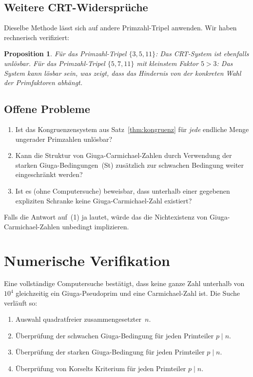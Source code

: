 \documentclass[12pt,a4paper]{amsart}
\newtheorem{proposition}[theorem]{Proposition}
\theoremstyle{definition}
\begin{document}
\subsection{Weitere CRT-Widersprüche}

Dieselbe Methode lässt sich auf andere Primzahl-Tripel anwenden.
Wir haben rechnerisch verifiziert:

\begin{proposition}
Für das Primzahl-Tripel $\{3, 5, 11\}$: Das CRT-System ist ebenfalls unlösbar.
Für das Primzahl-Tripel $\{5, 7, 11\}$ mit kleinstem Faktor $5 > 3$: Das System
kann lösbar sein, was zeigt, dass das Hindernis von der konkreten Wahl der
Primfaktoren abhängt.
\end{proposition}

\subsection{Offene Probleme}

\begin{enumerate}
  \item Ist das Kongruenzensystem aus Satz~\ref{thm:kongruenz} für \emph{jede} endliche
        Menge ungerader Primzahlen unlösbar?
  \item Kann die Struktur von Giuga-Carmichael-Zahlen durch Verwendung der starken
        Giuga-Bedingungen~(St) zusätzlich zur schwachen Bedingung weiter eingeschränkt
        werden?
  \item Ist es (ohne Computersuche) beweisbar, dass unterhalb einer gegebenen expliziten
        Schranke keine Giuga-Carmichael-Zahl existiert?
\end{enumerate}

Falls die Antwort auf~(1) ja lautet, würde das die Nichtexistenz von
Giuga-Carmichael-Zahlen unbedingt implizieren.

\section{Numerische Verifikation}

Eine vollständige Computersuche bestätigt, dass keine ganze Zahl unterhalb von~$10^4$
gleichzeitig ein Giuga-Pseudoprim und eine Carmichael-Zahl ist. Die Suche verläuft so:
\begin{enumerate}
  \item Auswahl quadratfreier zusammengesetzter~$n$.
  \item Überprüfung der schwachen Giuga-Bedingung für jeden Primteiler $p \mid n$.
  \item Überprüfung der starken Giuga-Bedingung für jeden Primteiler $p \mid n$.
  \item Überprüfung von Korselts Kriterium für jeden Primteiler $p \mid n$.
\end{enumerate}
\end{document}
